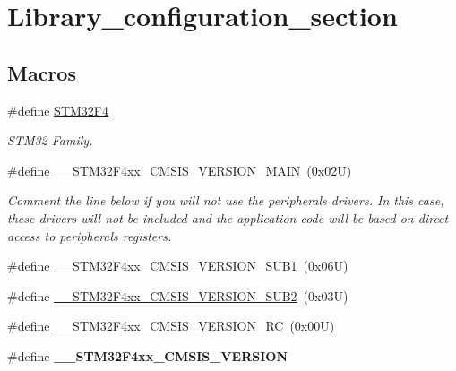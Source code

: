 \hypertarget{group___library__configuration__section}{}\section{Library\+\_\+configuration\+\_\+section}
\label{group___library__configuration__section}
\subsection*{Macros}
\begin{DoxyCompactItemize}
\item 
\mbox{\label{group___library__configuration__section_ga84d985cb5667176091597f71ffdb9307}} 
\#define \hyperlink{group___library__configuration__section_ga84d985cb5667176091597f71ffdb9307}{S\+T\+M32\+F4}
\begin{DoxyCompactList}\small\item\em S\+T\+M32 Family. \end{DoxyCompactList}\item 
\#define \hyperlink{group___library__configuration__section_gaf867da11218022a14245b854f6be6a40}{\+\_\+\+\_\+\+S\+T\+M32\+F4xx\+\_\+\+C\+M\+S\+I\+S\+\_\+\+V\+E\+R\+S\+I\+O\+N\+\_\+\+M\+A\+IN}~(0x02\+U)
\begin{DoxyCompactList}\small\item\em Comment the line below if you will not use the peripherals drivers. In this case, these drivers will not be included and the application code will be based on direct access to peripherals registers. \end{DoxyCompactList}\item 
\#define \hyperlink{group___library__configuration__section_ga4841e20bc5159a594936808c113ae3bc}{\+\_\+\+\_\+\+S\+T\+M32\+F4xx\+\_\+\+C\+M\+S\+I\+S\+\_\+\+V\+E\+R\+S\+I\+O\+N\+\_\+\+S\+U\+B1}~(0x06\+U)
\item 
\#define \hyperlink{group___library__configuration__section_ga6ccbf6336bfb67bf4daeb05eba18a5e3}{\+\_\+\+\_\+\+S\+T\+M32\+F4xx\+\_\+\+C\+M\+S\+I\+S\+\_\+\+V\+E\+R\+S\+I\+O\+N\+\_\+\+S\+U\+B2}~(0x03\+U)
\item 
\#define \hyperlink{group___library__configuration__section_gafbd304f122892833ce0d4daa3dc4ff13}{\+\_\+\+\_\+\+S\+T\+M32\+F4xx\+\_\+\+C\+M\+S\+I\+S\+\_\+\+V\+E\+R\+S\+I\+O\+N\+\_\+\+RC}~(0x00\+U)
\item 
\#define {\bfseries \+\_\+\+\_\+\+S\+T\+M32\+F4xx\+\_\+\+C\+M\+S\+I\+S\+\_\+\+V\+E\+R\+S\+I\+ON}
\end{DoxyCompactItemize}


